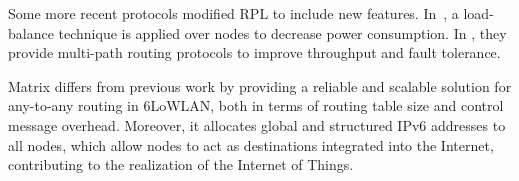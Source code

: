
Some more recent protocols \cite{Palani2015, Moghadam:2015:MMR:2766739.2766774,
7374975} modified RPL to include new features. In~\cite{Palani2015}, a
load-balance technique is applied over nodes to decrease power consumption. In
\cite{Moghadam:2015:MMR:2766739.2766774, 7374975}, they provide multi-path
routing protocols to improve throughput and fault tolerance.

Matrix differs from previous work by providing a reliable and scalable solution
for any-to-any routing in 6LoWLAN, both in terms of routing table size and
control message overhead. Moreover, it allocates global and structured IPv6
addresses to all nodes, which allow nodes to act as destinations integrated into
the Internet, contributing to the realization of the Internet of Things.



